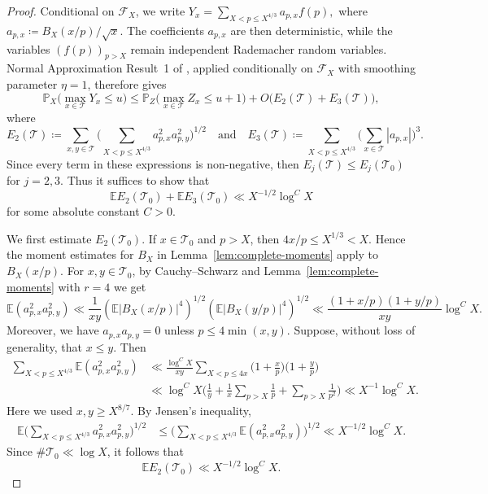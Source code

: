 \documentclass[a4paper,12pt,reqno]{amsart}
\numberwithin{equation}{section}
\theoremstyle{remark}
\newcommand{\E}{\mathbb{E}}
\newcommand{\p}{\mathbb{P}}
\begin{document}
\begin{proof}
Conditional on \(\mathscr F_X\),  we write
\(
 Y_x
 =
 \sum_{X<p\leq X^{4/3}}a_{p,x}f(p),\) where
 \(a_{p,x}\coloneqq {B_X(x/p)}/{\sqrt x}.
\)
The coefficients \(a_{p,x}\) are then deterministic, while the variables
\((f(p))_{p>X}\) remain independent Rademacher random variables.
Normal Approximation Result~1 of \cite{Harper2023Large}, applied
conditionally on \(\mathscr F_X\) with smoothing parameter \(\eta=1\),
therefore gives
\[
 \p_X\big(\max_{x\in\mathcal T}Y_x\leq u\big)
 \leq
 \p_Z\big(\max_{x\in\mathcal T}Z_x\leq u+1\big)
 +O\bigl(E_2(\mathcal T)+E_3(\mathcal T)\bigr),
\]
where
\[
 E_2(\mathcal T)
 \coloneqq
 \sum_{x,y\in\mathcal T}
 \bigg(
 \sum_{X<p\leq X^{4/3}}
 a_{p,x}^2a_{p,y}^2
 \bigg)^{1/2}\quad
\text{and}\quad
 E_3(\mathcal T)
 \coloneqq
 \sum_{X<p\leq X^{4/3}}
 \bigg(
 \sum_{x\in\mathcal T}|a_{p,x}|
 \bigg)^3.
\]
Since every term in these expressions is non-negative, then
\(
 E_j(\mathcal T)\leq E_j(\mathcal T_0)
\) for $j=2,3$.
Thus it suffices to show that
\begin{equation}\label{eq:stein-E2E3-mean}
 \E E_2(\mathcal T_0)+\E E_3(\mathcal T_0)
 \ll X^{-1/2}\log^C X
\end{equation}
for some absolute constant \(C>0\).

We first estimate \(E_2(\mathcal T_0)\). If
\(x\in\mathcal T_0\) and \(p>X\), then
\(
 {4x}/{p}
 \leq X^{1/3}<X.
\)
Hence the moment estimates for \(B_X\) in
Lemma~\ref{lem:complete-moments} apply to \(B_X(x/p)\). For
\(x,y\in\mathcal T_0\), by Cauchy--Schwarz and Lemma~\ref{lem:complete-moments} with $r=4$ we get
\[
 \E\left(a_{p,x}^2a_{p,y}^2\right)
 \ll 
 \frac{1}{xy}\left(\E|B_X({x}/{p})|^4\right)^{1/2} 
\left(\E|B_X({y}/{p})|^4\right)^{1/2}
 \ll
 \frac{(1+x/p)(1+y/p)}{xy}\log^C X.
\]
Moreover, we have \( a_{p,x}a_{p,y}=0\) unless \( p\leq4\min(x,y).
\)
Suppose, without loss of generality, that \(x\leq y\). Then
\[
 \begin{aligned}
 \sum_{X<p\leq X^{4/3}}
 \E\left(a_{p,x}^2a_{p,y}^2\right)
 &\ll
 \frac{\log^C X}{xy}
 \sum_{X<p\leq4x}
 \Big(1+\frac{x}{p}\Big)
 \Big(1+\frac{y}{p}\Big)\\
 &\ll
 \log^C X
 \bigg(
 \frac1y
 +\frac1x\sum_{p>X}\frac1p
 +\sum_{p>X}\frac1{p^2}
 \bigg)\ll X^{-1}\log^C X.
 \end{aligned}
\]
Here we used \(x,y\geq X^{8/7}\).
By Jensen's inequality,
\[
 \begin{aligned}
 \E\bigg(
 \sum_{X<p\leq X^{4/3}}
 a_{p,x}^2a_{p,y}^2
 \bigg)^{1/2}
 &\leq
 \bigg(
 \sum_{X<p\leq X^{4/3}}
 \E(a_{p,x}^2a_{p,y}^2)
 \bigg)^{1/2}\ll X^{-1/2}\log^C X.
 \end{aligned}
\]
Since \(\#\mathcal T_0\ll\log X\), it follows that
\begin{equation}\label{eq:stein-E2-mean}
 \E E_2(\mathcal T_0)
 \ll X^{-1/2}\log^C X.
\end{equation}


\end{proof}
\end{document}
